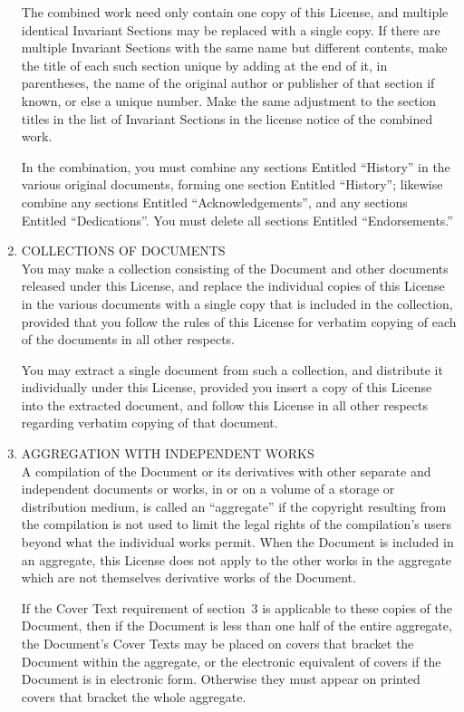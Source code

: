 \begin{enumerate}
  The combined work need only contain one copy of this License, and multiple identical Invariant
  Sections may be replaced with a single copy.  If there are multiple Invariant Sections with
  the same name but different contents, make the title of each such section unique by adding at
  the end of it, in parentheses, the name of the original author or publisher of that section if
  known, or else a unique number.  Make the same adjustment to the section titles in the list of
  Invariant Sections in the license notice of the combined work.

  In the combination, you must combine any sections Entitled ``History'' in the various original
  documents, forming one section Entitled ``History''; likewise combine any sections Entitled
  ``Acknowledgements'', and any sections Entitled ``Dedications''.  You must delete all sections
  Entitled ``Endorsements.''

\item
  COLLECTIONS OF DOCUMENTS \\
  You may make a collection consisting of the Document and other documents released under this
  License, and replace the individual copies of this License in the various documents with a
  single copy that is included in the collection, provided that you follow the rules of this
  License for verbatim copying of each of the documents in all other respects.

  You may extract a single document from such a collection, and distribute it individually under
  this License, provided you insert a copy of this License into the extracted document, and
  follow this License in all other respects regarding verbatim copying of that document.

\item
  AGGREGATION WITH INDEPENDENT WORKS \\
  A compilation of the Document or its derivatives with other separate and independent documents
  or works, in or on a volume of a storage or distribution medium, is called an ``aggregate'' if
  the copyright resulting from the compilation is not used to limit the legal rights of the
  compilation's users beyond what the individual works permit.  When the Document is included in
  an aggregate, this License does not apply to the other works in the aggregate which are not
  themselves derivative works of the Document.

  If the Cover Text requirement of section~3 is applicable to these copies of the Document, then
  if the Document is less than one half of the entire aggregate, the Document's Cover Texts may
  be placed on covers that bracket the Document within the aggregate, or the electronic
  equivalent of covers if the Document is in electronic form.  Otherwise they must appear on
  printed covers that bracket the whole aggregate.


\end{enumerate}
